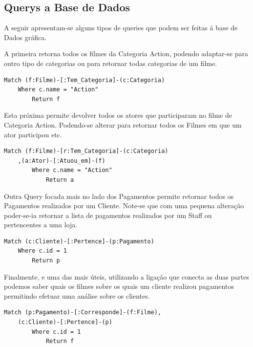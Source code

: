 \subsection{Querys a Base de Dados}

A seguir apresentam-se alguns tipos de queries que podem ser feitas á base de Dados gráfica.\newline
\par A primeira retorna todos os filmes da Categoria Action, podendo adaptar-se para outro tipo de categorias ou para retornar todas categorias de um filme.

\begin{lstlisting}[caption=Query ao Neo4j para retornar os filmes da categoria ação]
Match (f:Filme)-[:Tem_Categoria]-(c:Categoria) 
	Where c.name = "Action" 
		Return f
\end{lstlisting}

Esta próxima permite devolver todos os atores que participaram no filme de Categoria Action. Podendo-se alterar para retornar todos os Filmes em que um ator participou etc.

\begin{lstlisting}[caption=Query ao Neo4j para retornar todos os atores que participaram em filmes de Action]
Match (f:Filme)-[r:Tem_Categoria]-(c:Categoria)
	,(a:Ator)-[:Atuou_em]-(f) 
		Where c.name = "Action" 
			Return a
\end{lstlisting}

Outra Query focada mais no lado dos Pagamentos permite retornar todos os Pagamentos realizados por um Cliente. Note-se que com uma pequena alteração poder-se-ia retornar a lista de pagamentos realizados por um Staff ou pertencentes a uma loja.

\begin{lstlisting}[caption=Query ao Neo4j para retornar todos os Pagamentos de um determindado Cliente]
Match (c:Cliente)-[:Pertence]-(p:Pagamento) 
	Where c.id = 1 
		Return p
\end{lstlisting}

Finalmente, e uma das mais úteis, utilizando a ligação que conecta as duas partes podemos saber quais os filmes sobre os quais um cliente realizou pagamentos permitindo efetuar uma análise sobre os clientes.

\begin{lstlisting}[caption=Query ao Neo4j para retornar todos os filmes que um determinar Cliente já pagou por]
Match (p:Pagamento)-[:Corresponde]-(f:Filme),
	(c:Cliente)-[:Pertence]-(p) 
		Where c.id = 1 
			Return f
\end{lstlisting}
